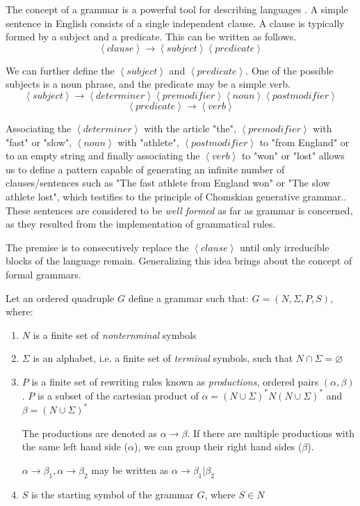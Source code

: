 The concept of a grammar is a powerful tool for describing languages \cite[p. 52]{Linz2016Introduction}. A simple sentence in English consists of a single independent clause. A clause is typically formed by a subject and a predicate. This can be written as follows.
$$ \left< clause \right> \rightarrow \left< subject \right> \left< predicate \right> $$

We can further define the $\left< subject \right>$ and $\left< predicate \right>$. One of the possible subjects is a noun phrase, and the predicate may be a simple verb.
$$\left< subject \right>   \rightarrow   \left< determiner \right>   \left< premodifier \right>    \left< noun \right>    \left< postmodifier \right>$$
$$\left< predicate \right> \rightarrow \left< verb \right>$$

Associating the $\left< determiner \right>$ with the article "the", $\left< premodifier \right>$ with "fast" or "slow", $\left< noun \right>$ with "athlete", $\left< postmodifier \right>$ to "from England" or to an empty string and finally associating the $\left< verb \right>$ to "won" or "lost" allows us to define a pattern capable of generating an infinite number of clauses/sentences such as "The fast athlete from England won" or "The slow athlete lost", which testifies to the principle of Chomskian generative grammar.. These sentences are considered to be \emph{well formed} as far as grammar is concerned, as they resulted from the implementation of grammatical rules.

The premise is to consecutively replace the $\left< clause \right>$ until only irreducible blocks of the language remain. Generalizing this idea brings about the concept of formal grammars.

\begin{definition}[Grammar]
\label{def:grammar}
\cite{Salomaa1987Formal}
Let an ordered quadruple $G$ define a grammar such that: $G=\left(N, \Sigma, P, S \right)$, where:
\begin{enumerate}
\item $N$ is a finite set of \emph{nonternminal} symbols
\item $\Sigma$ is an alphabet, i.e. a finite set of \emph{terminal} symbols, such that $N \cap \Sigma = \varnothing$
\item $P$ is a finite set of rewriting rules known as \emph{productions}, ordered pairs $\left( \alpha, \beta \right)$.
$P$ is a subset of the cartesian product of $\alpha = \left(N \cup \Sigma\right)^* N \left(N \cup \Sigma\right)^*$ and $\beta = \left(N \cup \Sigma\right)^*$


The productions are denoted as $\alpha \rightarrow \beta$.
If there are multiple productions with the same left hand side ($\alpha$), we can group their right hand sides ($\beta$).


$\alpha \rightarrow \beta_1, \alpha \rightarrow \beta_2$ may be written as $\alpha \rightarrow \beta_1 | \beta_2$

\item $S$ is the starting symbol of the grammar $G$, where $S \in N$
\end{enumerate}
\end{definition}

